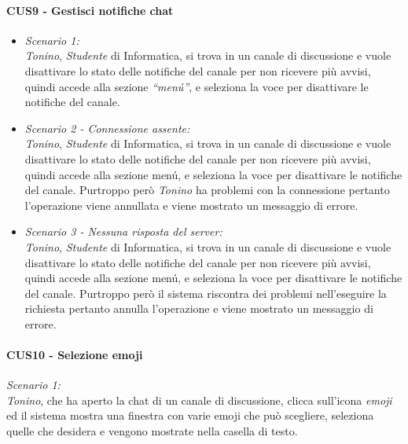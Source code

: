 \paragraph{CUS9 - Gestisci notifiche chat\\}
\begin{itemize}
	\item \textit{Scenario 1:\\}
	\textit{Tonino}, \textit{Studente} di Informatica, si trova in un canale di discussione e vuole disattivare lo stato delle notifiche del canale per non ricevere più avvisi, quindi accede alla sezione \textit{“menú”}, e seleziona la voce per disattivare le notifiche del canale.\\
	
	\item \textit{Scenario 2 - Connessione assente:\\}
	\textit{Tonino}, \textit{Studente} di Informatica, si trova in un canale di discussione e vuole disattivare lo stato delle notifiche del canale per non ricevere più avvisi, quindi accede alla sezione menú, e seleziona la voce per disattivare le notifiche del canale. Purtroppo però \textit{Tonino} ha problemi con la connessione pertanto l’operazione viene annullata e viene mostrato un messaggio di errore.\\
	
	\item \textit{Scenario 3 - Nessuna risposta del server:\\}
	\textit{Tonino}, \textit{Studente} di Informatica, si trova in un canale di discussione e vuole disattivare lo stato delle notifiche del canale per non ricevere più avvisi, quindi accede alla sezione menú, e seleziona la voce per disattivare le notifiche del canale. Purtroppo però il sistema riscontra dei problemi nell’eseguire la richiesta pertanto annulla l’operazione e viene mostrato un messaggio di errore.\\
	
\end{itemize}


\paragraph{CUS10 - Selezione emoji\\}

\textit{Scenario 1:\\}
\textit{Tonino}, che ha aperto la chat di un canale di discussione, clicca sull’icona \textit{emoji} ed il sistema mostra una finestra con varie emoji che può scegliere, seleziona quelle che desidera e vengono mostrate nella casella di testo.

